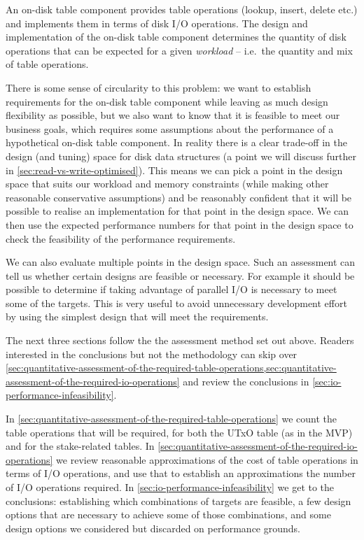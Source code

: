 \documentclass[11pt,a4paper]{article}
\begin{document}
An on-disk table component provides table operations ({\sc lookup, insert,
delete} etc.) and implements them in terms of disk I/O operations. The
design and implementation of the on-disk table component determines the
quantity of disk operations that can be expected for a given \emph{workload} --
i.e.~the quantity and mix of table operations.

There is some sense of circularity to this problem: we want to establish
requirements for the on-disk table component while leaving as much design
flexibility as possible, but we also want to know that it is feasible to meet
our business goals, which requires some assumptions about the performance of a
hypothetical on-disk table component. In reality there is a clear trade-off in
the design (and tuning) space for disk data structures (a point we will discuss
further in \cref{sec:read-vs-write-optimised}). This means we can pick a point
in the design space that suits our workload and memory constraints (while
making other reasonable conservative assumptions) and be reasonably confident
that it will be possible to realise an implementation for that point in the
design space. We can then use the expected performance numbers for that point
in the design space to check the feasibility of the performance requirements.

We can also evaluate multiple points in the design space. Such an assessment
can tell us whether certain designs are feasible or necessary. For example it
should be possible to determine if taking advantage of parallel I/O is
necessary to meet some of the targets. This is very useful to avoid unnecessary
development effort by using the simplest design that will meet the requirements.

The next three sections follow the the assessment method set out above. Readers
interested in the conclusions but not the methodology can skip over
\cref{sec:quantitative-assessment-of-the-required-table-operations,sec:quantitative-assessment-of-the-required-io-operations} and
review the conclusions in \cref{sec:io-performance-infeasibility}.

In \cref{sec:quantitative-assessment-of-the-required-table-operations}
we count the table operations that will be required, for both the UTxO
table (as in the MVP) and for the stake-related tables. In
\cref{sec:quantitative-assessment-of-the-required-io-operations} we review
reasonable approximations of the cost of table operations in terms of I/O
operations, and use that to establish an approximations the number of I/O
operations required. In \cref{sec:io-performance-infeasibility} we get to the
conclusions: establishing which combinations of targets are feasible, a few
design options that are necessary to achieve some of those combinations, and
some design options we considered but discarded on performance grounds.
\end{document}

